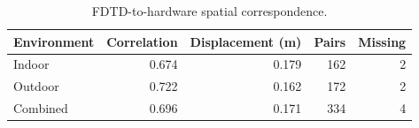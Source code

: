 \begin{table}[t]
\centering
\caption{FDTD-to-hardware spatial correspondence.}
\label{tab:q4_comparison}
\footnotesize
\setlength{\tabcolsep}{3pt}
\begin{tabular}{lrrrr}
\hline
Environment & Correlation & Displacement (m) & Pairs & Missing \\
\hline
Indoor & 0.674 & 0.179 & 162 & 2 \\
Outdoor & 0.722 & 0.162 & 172 & 2 \\
Combined & 0.696 & 0.171 & 334 & 4 \\
\hline
\end{tabular}
\end{table}
